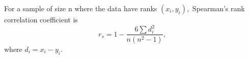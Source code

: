  For a sample of size n where the data have ranks $(x_{i}, y_{i}),$  
Spearman's rank correlation coefficient is 
\[ r_s = 1 - \frac{6 \sum d_i ^2 }{n(n^2 - 1) } , \]
where $d_{i}=x_{i}-y_{i}.$ 
